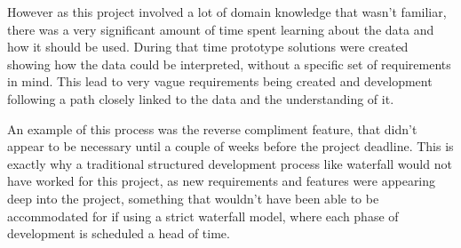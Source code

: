 However as this project involved a lot of domain knowledge that wasn't familiar, there was a very significant amount of time spent learning about the data and how it should be used. During that time prototype solutions were created showing how the data could be interpreted, without a specific set of requirements in mind. This lead to very vague requirements being created and development following a path closely linked to the data and the understanding of it. 

An example of this process was the reverse compliment feature, that didn't appear to be necessary until a couple of weeks before the project deadline. This is exactly why a traditional structured development process like waterfall would not have worked for this project, as new requirements and features were appearing deep into the project, something that wouldn't have been able to be accommodated for if using a strict waterfall model, where each phase of development is scheduled a head of time.
